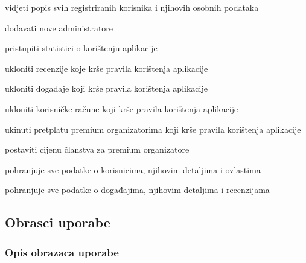 \begin{packed_enum}
\begin{packed_enum}
					\item vidjeti popis svih registriranih korisnika i njihovih osobnih podataka
					\item dodavati nove administratore
					\item pristupiti statistici o korištenju aplikacije
					\item ukloniti recenzije koje krše pravila korištenja aplikacije
					\item ukloniti događaje koji krše pravila korištenja aplikacije
					\item ukloniti korisničke račune koji krše pravila korištenja aplikacije
					\item ukinuti pretplatu premium organizatorima koji krše pravila korištenja aplikacije
					\item postaviti cijenu članstva za premium organizatore					
				\end{packed_enum}

				\item  {}
				
				\begin{packed_enum}
					
					\item pohranjuje sve podatke o korisnicima, njihovim detaljima i ovlastima
					\item pohranjuje sve podatke o događajima, njihovim detaljima i recenzijama
					
				\end{packed_enum}
			\end{packed_enum}
			
			\eject 
			
			
				
			\subsection{Obrasci uporabe}
				
				
				\subsubsection{Opis obrazaca uporabe}
					

